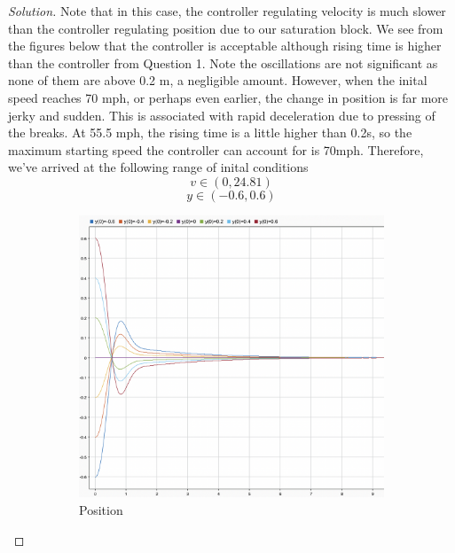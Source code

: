 \documentclass{article}
\begin{document}
\begin{proof}[Solution]
Note that in this case, the controller regulating velocity is much slower than the controller regulating position due to our saturation block. 
We see from the figures below that the controller is acceptable although rising time is higher than the controller from Question 1.
Note the oscillations are not significant as none of them are above 0.2 m, a negligible amount. However, when the inital speed reaches
70 mph, or perhaps even earlier, the change in position is far more jerky and sudden. This is associated with rapid deceleration due to pressing of the breaks.
At 55.5 mph, the rising time is a little higher than 0.2s, so the maximum starting speed the controller can account for is 70mph.
Therefore, we've arrived at the following range of inital conditions
\[ v \in (0, 24.81) 
\]
\[ y \in (-0.6, 0.6)
\]
\begin{figure}[h!]
    \centering
    \begin{subfigure}{0.4\linewidth}
      \includegraphics[width=\linewidth]{img14.png}
      \caption{Position}
    \end{subfigure}
    \begin{subfigure}{0.4\linewidth}

\end{subfigure}
\end{figure}
\end{proof}
\end{document}
